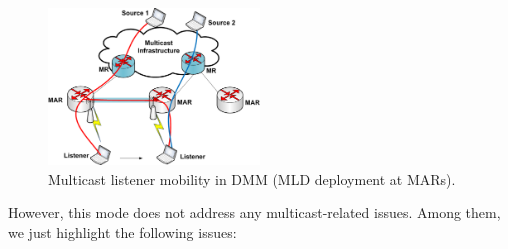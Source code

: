 \begin{figure}[h!] 
 \begin{center} 
 \includegraphics[width=0.50\textwidth]{./Part1/Chapter2/figures/c4_dmm_listener_mld.eps} 
    \caption{Multicast listener mobility in DMM (MLD deployment at MARs).}
     \label{fig:c4_dmm_listener_mld}
  \end{center} 
\end{figure}
However, this mode does not address any multicast-related issues. Among them, we just highlight the following issues: 
